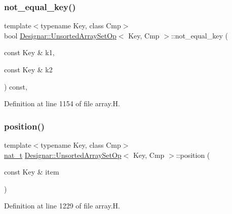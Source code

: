 \subsubsection{\texorpdfstring{not\+\_\+equal\+\_\+key()}{not\_equal\_key()}}
{\footnotesize\ttfamily template$<$typename Key, class Cmp$>$ \\
bool \hyperlink{class_designar_1_1_unsorted_array_set_op}{Designar\+::\+Unsorted\+Array\+Set\+Op}$<$ Key, Cmp $>$\+::not\+\_\+equal\+\_\+key (\begin{DoxyParamCaption}\item[{const Key \&}]{k1,  }\item[{const Key \&}]{k2 }\end{DoxyParamCaption}) const\hspace{0.3cm}{\ttfamily [inline]}, {\ttfamily [protected]}}



Definition at line 1154 of file array.\+H.

\mbox{\label{class_designar_1_1_unsorted_array_set_op_ab2f0ef08a3d92669f793727d51de705e}} 
\subsubsection{\texorpdfstring{position()}{position()}}
{\footnotesize\ttfamily template$<$typename Key, class Cmp$>$ \\
\hyperlink{namespace_designar_aa72662848b9f4815e7bf31a7cf3e33d1}{nat\+\_\+t} \hyperlink{class_designar_1_1_unsorted_array_set_op}{Designar\+::\+Unsorted\+Array\+Set\+Op}$<$ Key, Cmp $>$\+::position (\begin{DoxyParamCaption}\item[{const Key \&}]{item }\end{DoxyParamCaption})\hspace{0.3cm}{\ttfamily [inline]}}



Definition at line 1229 of file array.\+H.

\mbox{\label{class_designar_1_1_unsorted_array_set_op_aced2517a0e708effb820f5591369a7c1}} 
